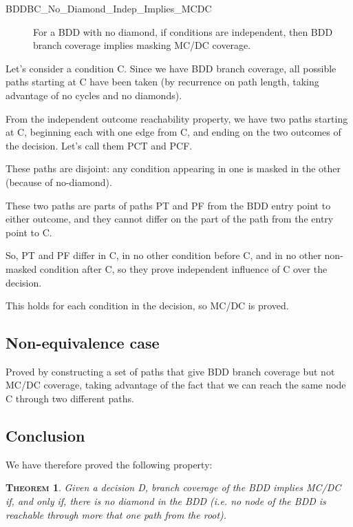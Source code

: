 \documentclass[a4paper,12pt,twoside]{article}
\newtheorem{theorem}{\textsc{Theorem}}
\begin{document}
\begin{description}
\item[BDDBC\_No\_Diamond\_Indep\_Implies\_MCDC]
  For a BDD with no diamond, if conditions are independent, then
  BDD branch coverage implies masking MC/DC coverage.
\end{description}

Let's consider a condition C. Since we have BDD branch coverage,
all possible paths starting at C have been taken (by recurrence on path
length, taking advantage of no cycles and no diamonds).

From the independent outcome reachability property, we have two paths
starting at C, beginning each with one edge from C, and ending on the
two outcomes of the decision. Let's call them PCT and PCF.

These paths are disjoint: any condition appearing in one is masked
in the other (because of no-diamond).

These two paths are parts of paths PT and PF from the BDD entry point to
either outcome, and they cannot differ on the part of the path from the
entry point to C.

So, PT and PF differ in C, in no other condition before C, and in no
other non-masked condition after C, so they prove independent influence
of C over the decision.

This holds for each condition in the decision, so MC/DC is proved.

\subsection{Non-equivalence case}

Proved by constructing a set of paths that give BDD branch coverage but
not MC/DC coverage, taking advantage of the fact that we can reach the
same node C through two different paths.


\subsection{Conclusion}

We have therefore proved the following property:

\begin{theorem}
  \label{thm:no-diamond}
  Given a decision D, branch coverage of the BDD implies MC/DC if,
  and only if, there is no diamond in the BDD (i.e.  no node of the
  BDD is reachable through more that one path from the root).
\end{theorem}
\end{document}
